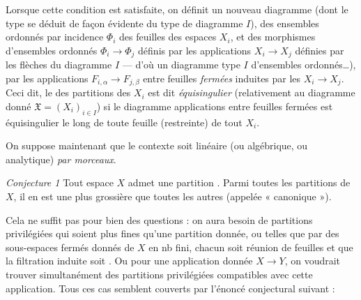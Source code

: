 \documentclass[11pt,a4paper]{article}
\begin{document}
Lorsque cette condition est satisfaite, on définit un nouveau diagramme
(dont le type se déduit de façon évidente du type de diagramme $I$), des
ensembles ordonnés par incidence  $\Phi_i$ des feuilles des
espaces $X_i$, et des morphismes d'ensembles ordonnés \struck{\ill{}}
$\Phi_i \to \Phi_j$ définis par les  applications $X_i \to
X_j$ définies par les flèches du diagramme $I$ --- d'où un diagramme
  type $I$ d'ensembles ordonnés\ldots),
par les applications $F_{i,\alpha} \to F_{j,\beta}$ entre feuilles
\emph{fermées} induites par les $X_i \to X_j$. Ceci dit, le
   des partitions des $X_i$
est dit \emph{équisingulier} (relativement au diagramme donné $\mathfrak{X}
= (X_i)_{i \in I}$)   si le diagramme  \struck{\ill{}} applications entre
feuilles fermées est équisingulier le long de toute feuille (restreinte) de
tout $X_i$.


On suppose maintenant que le contexte soit linéaire (ou algébrique, ou
analytique) \emph{par morceaux}.

\emph{Conjecture 1} Tout espace $X$ admet une partition
 . Parmi toutes les partitions
  de $X$, il en est une plus
grossière que toutes les autres (appelée « canonique »).

Cela ne suffit pas pour bien des questions : on aura besoin de partitions
privilégiées qui \struck{\ill{}} soient   plus fines qu'une partition donnée, ou telles que
  par des sous-espaces fermés donnés de $X$
en nb fini, chacun soit réunion de feuilles et que la filtration induite
soit  . Ou pour une application
donnée $X \to Y$, on voudrait trouver simultanément des partitions
privilégiées compatibles avec cette application. Tous ces cas semblent
couverts par l'énoncé conjectural suivant :
\end{document}
